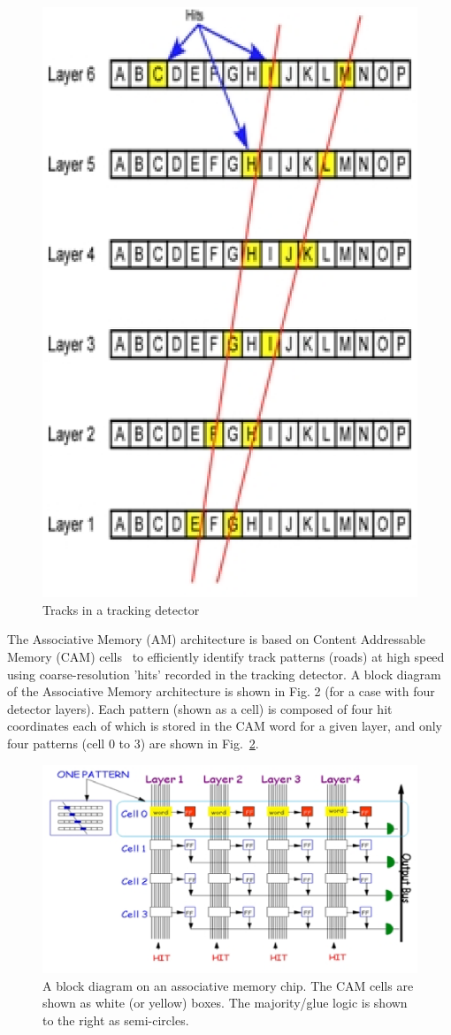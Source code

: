 \begin{figure}[ht!]
\centering
\includegraphics[width=0.4\columnwidth]{Plots/AM_pple2.eps}
\caption{Tracks in a tracking detector}
\label{fig:AM_principle_1}
\end{figure}

\noindent The Associative Memory (AM) architecture is based on Content Addressable Memory (CAM) cells~\cite{bib:Koh-87,bib:Pag-06} to efficiently identify track patterns (roads) at high speed using coarse-resolution 'hits' recorded in the tracking detector. A block diagram~\cite{bib:Rist-89} of the Associative Memory architecture is shown in Fig. 2 (for a case with four detector layers).  Each pattern (shown as a cell) is composed of four hit coordinates each of which is stored in the CAM word for a given layer, and only four patterns (cell 0 to 3) are shown in Fig.~\ref{fig:AM_principle_2}. 

\begin{figure}[ht!]
\centering
\includegraphics[width=0.9\columnwidth]{Plots/AM_pple.eps}
\caption{A block diagram on an associative memory chip. The CAM cells are shown as white (or yellow) boxes. The majority/glue logic is shown to the right as semi-circles.}
\label{fig:AM_principle_2}
\end{figure}

